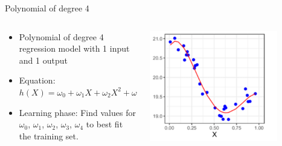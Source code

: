 \begin{frame}{Polynomial of degree 4}
  \begin{columns}
    \begin{column}{0.5\textwidth}
  \begin{itemize}
    \item Polynomial of degree 4 regression model with 1 input and 1 output
    \item Equation: $h(X) = \omega_0 + \omega_1 X + \omega_2 X^2 + \omega_3 X^3 + \omega_4 X^4$
    \item Learning phase: Find values for $\omega_0$, $\omega_1$, $\omega_2$, $\omega_3$, $\omega_4$ to best fit the training set.
  \end{itemize}
\end{column}
\begin{column}{0.5\textwidth}
  \includegraphics[width=0.8\textwidth]{images/pm4.png}
\end{column}
\end{columns}
\end{frame}

